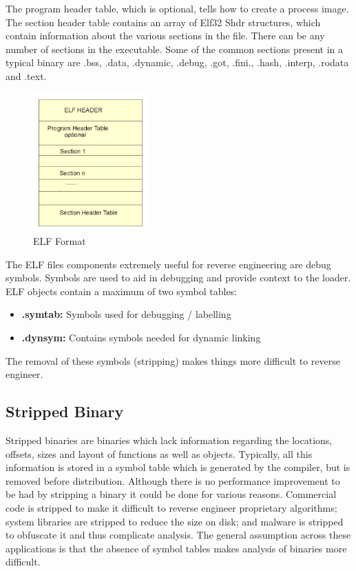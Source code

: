 \documentclass{article}
\begin{document}
The program header table, which is optional, tells how to create a process image. The section header table 
contains an array of Elf32 Shdr structures, which contain information about the various sections in the file. 
There can be any number of sections in the executable. Some of the common sections present in a typical binary 
are .bss, .data, .dynamic, .debug, .got, .fini., .hash, .interp, .rodata and .text. \citep{stripped}
\begin{figure}[H]
\centering
\includegraphics[width=0.4\textwidth]{img/ELF_Format.jpg}
\caption{ELF Format}
\label{fig:elf}
\end{figure}
The ELF files components extremely useful for reverse engineering are debug symbols. Symbols are used
to aid in debugging and provide context to the loader. ELF objects contain a maximum of two symbol tables:
\begin{itemize}
\item{\textbf{.symtab:}} Symbols used for debugging / labelling
\item{\textbf{.dynsym:}} Contains symbols needed for dynamic linking
\end{itemize}
The removal of these symbols (stripping) makes things more difficult to reverse engineer.

\subsection{Stripped Binary}

Stripped binaries are binaries which lack information regarding the locations, offsets, sizes and layout of functions 
as well as objects. Typically, all this information is stored in a symbol table which is generated by the compiler, 
but is removed before distribution. Although there is no performance improvement to be had by stripping a binary it 
could be done for various reasons. Commercial code is stripped to make it difficult to reverse engineer proprietary 
algorithms; system libraries are stripped to reduce the size on disk; and malware is stripped to obfuscate it and 
thus complicate analysis. The general assumption across these applications is that the absence of symbol tables 
makes analysis of binaries more difficult. \citep{stripped}
\end{document}
